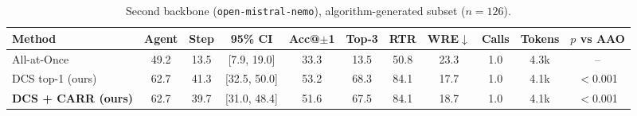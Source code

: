 \begin{table}[t]
\centering
\caption{Second backbone (\texttt{open-mistral-nemo}), algorithm-generated subset ($n=126$).}
\label{tab:backbone}
\footnotesize
\setlength{\tabcolsep}{4pt}
\begin{tabular}{@{}lcccccccccc@{}}
\toprule
Method & Agent & Step & 95\% CI & Acc@$\pm$1 & Top-3 & RTR & WRE$\downarrow$ & Calls & Tokens & $p$ vs AAO \\
\midrule
All-at-Once~\cite{zhang2025whowhen} & 49.2 & 13.5 & [7.9, 19.0] & 33.3 & 13.5 & 50.8 & 23.3 & 1.0 & 4.3k & -- \\
DCS top-1 (ours) & 62.7 & 41.3 & [32.5, 50.0] & 53.2 & 68.3 & 84.1 & 17.7 & 1.0 & 4.1k & $<$0.001 \\
\textbf{DCS + CARR (ours)} & 62.7 & 39.7 & [31.0, 48.4] & 51.6 & 67.5 & 84.1 & 18.7 & 1.0 & 4.1k & $<$0.001 \\
\bottomrule
\end{tabular}
\end{table}